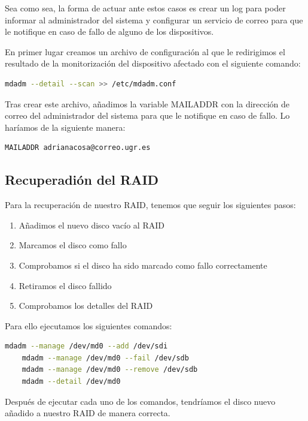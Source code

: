 Sea como sea, la forma de actuar ante estos casos es crear un log para poder informar al administrador del sistema y configurar un servicio de correo para que le notifique en caso de fallo de alguno de los dispositivos. 

En primer lugar creamos un archivo de configuración al que le redirigimos el resultado de la monitorización del dispositivo afectado con el siguiente comando:

\begin{lstlisting}[language=bash]
	mdadm --detail --scan >> /etc/mdadm.conf
\end{lstlisting}

Tras crear este archivo, añadimos la variable MAILADDR con la dirección de correo del administrador del sistema para que le notifique en caso de fallo. Lo haríamos de la siguiente manera: 

\begin{lstlisting}[language=bash]
	MAILADDR adrianacosa@correo.ugr.es
\end{lstlisting}


\subsection{Recuperadión del RAID}

Para la recuperación de nuestro RAID, tenemos que seguir los siguientes pasos:

\begin{enumerate}
	\item Añadimos el nuevo disco vacío al RAID 
	\item Marcamos el disco como fallo
	\item Comprobamos si el disco ha sido marcado como fallo correctamente
	\item Retiramos el disco fallido
	\item Comprobamos los detalles del RAID
\end{enumerate}

Para ello ejecutamos los siguientes comandos:

\begin{lstlisting}[language=bash]
	mdadm --manage /dev/md0 --add /dev/sdi
	mdadm --manage /dev/md0 --fail /dev/sdb
	mdadm --manage /dev/md0 --remove /dev/sdb
	mdadm --detail /dev/md0
\end{lstlisting}

Después de ejecutar cada uno de los comandos, tendríamos el disco nuevo añadido a nuestro RAID de manera correcta.

